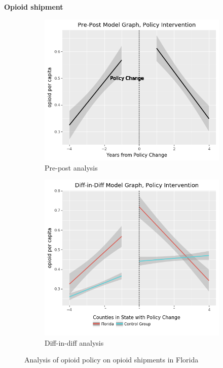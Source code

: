 \documentclass[12pt,letterpaper]{article}
\begin{document}
\textbf{Opioid shipment}

\begin{figure}[!h]
\centering
\begin{subfigure}{.5\textwidth}
  \centering
  \includegraphics[width=.9\linewidth]{../30_results/General_Results/florida_opioid_shipment_prepost.png}
  \caption{Pre-post analysis}
  \label{fig:fl_ship_prepost}
\end{subfigure}%
\begin{subfigure}{.5\textwidth}
  \centering
  \includegraphics[width=.9\linewidth]{../30_results/General_Results/florida_opioid_shipment_diffdiff.png}
  \caption{Diff-in-diff analysis}
  \label{fig:fl_ship_did}
\end{subfigure}
\caption{Analysis of opioid policy on opioid shipments in Florida}
\label{fig:fl_ship}
\end{figure}
\end{document}
